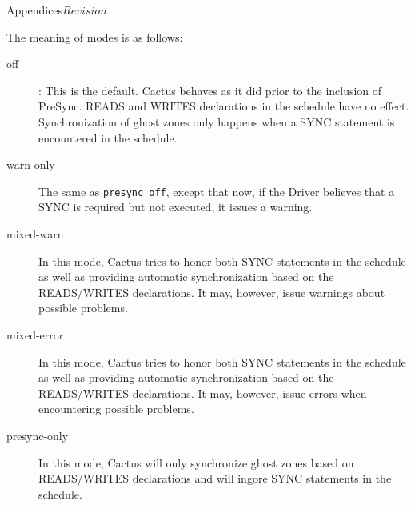 \begin{cactuspart}{Appendices}{}{$Revision$}
\begin{Lentry}
The meaning of modes is as follows:
\begin{description}
\item[off]: This is the default. Cactus behaves as it did prior to the inclusion of PreSync. READS and
WRITES declarations in the schedule have no effect. Synchronization of ghost zones only happens when
a SYNC statement is encountered in the schedule.
\item[warn-only] The same as \texttt{presync\_off}, except that now, if the Driver
believes that a SYNC is required but not executed, it issues a warning.
\item[mixed-warn]
In this mode, Cactus tries to honor both SYNC statements in
the schedule as well as providing automatic synchronization based on the READS/WRITES declarations.
It may, however, issue warnings about possible problems.
\item[mixed-error]
In this mode, Cactus tries to honor both SYNC statements in
the schedule as well as providing automatic synchronization based on the READS/WRITES declarations.
It may, however, issue errors when encountering possible problems.
\item[presync-only]
In this mode, Cactus will only synchronize ghost zones based on READS/WRITES declarations and will
ingore SYNC statements in the schedule.
\end{description}


\end{Lentry}
\end{cactuspart}
